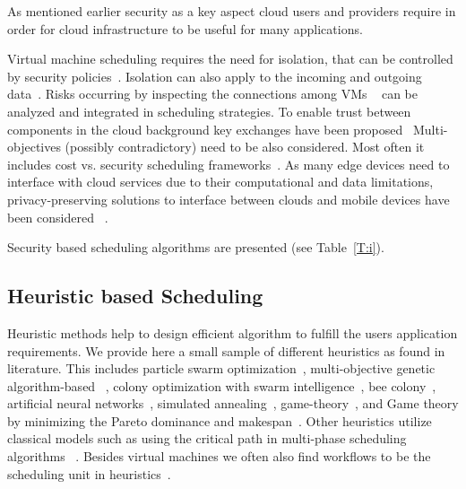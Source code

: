 \documentclass[final,5p,times,twocolumn]{elsarticle}
\begin{document}
As mentioned earlier security as a key aspect cloud users and
providers require in order for cloud infrastructure to be useful for
many applications.

Virtual machine scheduling requires the need for isolation, that can
be controlled by security
policies~\cite{afoulki2011security}. Isolation can also apply to the
incoming and outgoing data~\cite{chejerla2017qos,kashyap2014security}.
Risks occurring by inspecting the connections among VMs
~\cite{shetty2016security} can be analyzed and integrated in
scheduling strategies.  To enable trust between components in the
cloud background key exchanges have been proposed~\cite{liu2013ccbke}
Multi-objectives (possibly contradictory) need to be also
considered. Most often it includes cost vs. security scheduling
frameworks~\cite{kashyap2014security,zeng2015saba,wang2012cloud}.  As
many edge devices need to interface with cloud services due to their
computational and data limitations, privacy-preserving solutions to
interface between clouds and mobile devices have been considered
~\cite{bilogrevic2011meetings}.

Security based scheduling algorithms are presented (see
Table~\ref{T:i}). 





\subsection{Heuristic based Scheduling}\label{sec:heuristic}



Heuristic methods help to design efficient algorithm to fulfill the
users application requirements. We provide here a small sample of
different heuristics as found in literature. This includes particle
swarm optimization~\cite{pandey2010particle}, multi-objective genetic
algorithm-based ~\cite{mezmaz2011parallel,gkasior2016metaheuristic},
colony optimization with swarm intelligence~\cite{mateos2013aco}, bee
colony~\cite{ld2013honey}, artificial neural
networks~\cite{kousiouris2011effects}, simulated
annealing~\cite{torabzadeh2010cloud},
game-theory~\cite{gkasior2016metaheuristic}, and Game theory by
minimizing the Pareto dominance and makespan~\cite{su2013cost}.  Other
heuristics utilize classical models such as using the critical path in
multi-phase scheduling algorithms ~\cite
{abrishami2013deadline}. Besides virtual machines we often also find
workflows to be the scheduling unit in
heuristics~\cite{bousselmi2016qos}.
\end{document}
